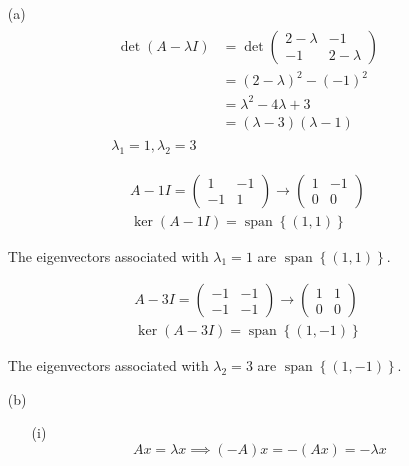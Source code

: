 \documentclass{article}
\newcommand{\set}[1]{\left\{ #1 \right\}}
\DeclareMathOperator{\spn}{span}
\begin{document}
\begin{enumerate}
  \item[(a)]
  \begin{gather*}
    \begin{split}
      \det(A - \lambda I) &= \det
      \begin{pmatrix}
        2 - \lambda & -1 \\
        -1 & 2 - \lambda
      \end{pmatrix} \\
      &= (2 - \lambda)^2 - (-1)^2 \\
      &= \lambda^2 - 4\lambda + 3 \\
      &= (\lambda - 3)(\lambda - 1)
    \end{split} \\
    \boxed{\lambda_1 = 1, \lambda_2 = 3}
  \end{gather*}

  \begin{gather*}
    A - 1I =
    \begin{pmatrix}
      1 & -1 \\
      -1 & 1
    \end{pmatrix}
    \rightarrow
    \begin{pmatrix}
      1 & -1 \\
      0 & 0
    \end{pmatrix} \\
    \ker(A - 1I) = \spn \set{(1, 1)}
  \end{gather*}

  The eigenvectors associated with \( \lambda_1 = 1 \) are \( \boxed{\spn
  \set{(1, 1)}} \).

  \begin{gather*}
    A - 3I =
    \begin{pmatrix}
      -1 & -1 \\
      -1 & -1
    \end{pmatrix}
    \rightarrow
    \begin{pmatrix}
      1 & 1 \\
      0 & 0
    \end{pmatrix} \\
    \ker(A - 3I) = \spn \set{(1, -1)}
  \end{gather*}

  The eigenvectors associated with \( \lambda_2 = 3 \) are \( \boxed{\spn
  \set{(1, -1)}} \).

  \item[(b)]
  \begin{enumerate}
    \item[(i)]
    \[ Ax = \lambda x \implies (-A)x = -(Ax) = -\lambda x \]


\end{enumerate}
\end{enumerate}
\end{document}
